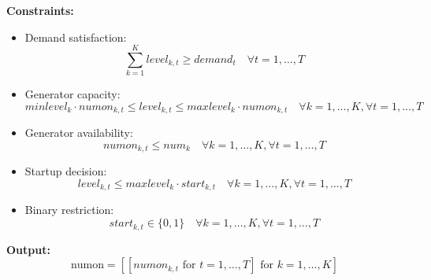 \documentclass{article}
\begin{document}
\textbf{Constraints:}
\begin{itemize}
    \item Demand satisfaction:
    \[
    \sum_{k=1}^{K} level_{k,t} \geq demand_t \quad \forall t = 1, \ldots, T
    \]

    \item Generator capacity:
    \[
    minlevel_k \cdot numon_{k,t} \leq level_{k,t} \leq maxlevel_k \cdot numon_{k,t} \quad \forall k = 1, \ldots, K, \forall t = 1, \ldots, T
    \]

    \item Generator availability:
    \[
    numon_{k,t} \leq num_k \quad \forall k = 1, \ldots, K, \forall t = 1, \ldots, T
    \]

    \item Startup decision:
    \[
    level_{k,t} \leq maxlevel_k \cdot start_{k,t} \quad \forall k = 1, \ldots, K, \forall t = 1, \ldots, T
    \]

    \item Binary restriction:
    \[
    start_{k,t} \in \{0, 1\} \quad \forall k = 1, \ldots, K, \forall t = 1, \ldots, T
    \]
\end{itemize}

\textbf{Output:}
\[
\text{numon} = [[numon_{k,t} \text{ for } t=1,\ldots,T] \text{ for } k=1,\ldots,K]
\]
\end{document}
